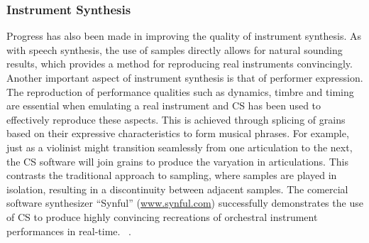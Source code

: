 \documentclass{scrartcl}
\begin{document}
    \subsubsection*{Instrument Synthesis}
    Progress has also been made in improving the quality of instrument
    synthesis. As with speech synthesis, the use of samples directly allows for
    natural sounding results, which provides a method for reproducing real
    instruments convincingly.\\
    Another important aspect of instrument synthesis is that of performer
    expression. The reproduction of performance qualities such as dynamics,
    timbre and timing are essential when emulating a real instrument and CS has
    been used to effectively reproduce these aspects. This is achieved through
    splicing of grains based on their expressive characteristics to form
    musical phrases.  For example, just as a violinist might transition
    seamlessly from one articulation to the next, the CS software will join
    grains to produce the varyation in articulations. This contrasts the
    traditional approach to sampling, where samples are played in isolation,
    resulting in a discontinuity between adjacent samples.  The comercial
    software synthesizer ``Synful'' (\url{www.synful.com}) successfully
    demonstrates the use of CS to produce highly convincing recreations of
    orchestral instrument performances in real-time.
    ~\parencite[p.82]{Lindemann2007}.
\end{document}
